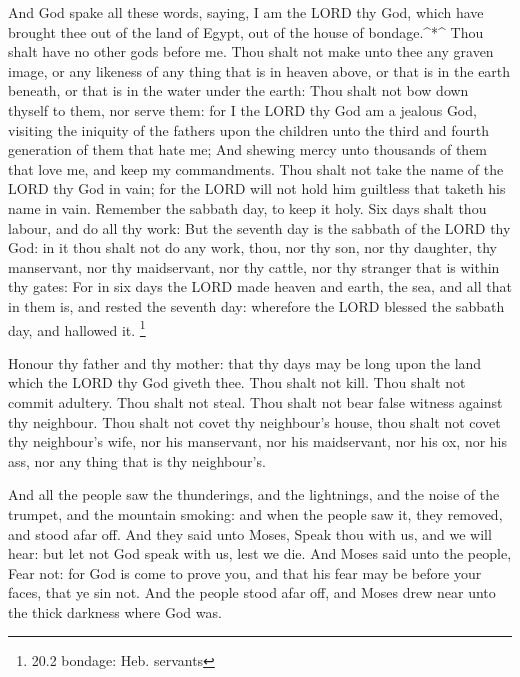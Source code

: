  And God spake all these words, saying,  I am
the LORD thy God, which have brought thee out of the land of Egypt, out
of the house of bondage.\^{}*\^{}  Thou shalt have no other
gods before me.  Thou shalt not make unto thee any graven
image, or any likeness of any thing that is in heaven above, or that is
in the earth beneath, or that is in the water under the earth:
 Thou shalt not bow down thyself to them, nor serve them:
for I the LORD thy God am a jealous God, visiting the iniquity of the
fathers upon the children unto the third and fourth generation of them
that hate me;  And shewing mercy unto thousands of them that
love me, and keep my commandments.  Thou shalt not take the
name of the LORD thy God in vain; for the LORD will not hold him
guiltless that taketh his name in vain.  Remember the
sabbath day, to keep it holy.  Six days shalt thou labour,
and do all thy work:  But the seventh day is the sabbath of
the LORD thy God: in it thou shalt not do any work, thou, nor thy son,
nor thy daughter, thy manservant, nor thy maidservant, nor thy cattle,
nor thy stranger that is within thy gates:  For in six days
the LORD made heaven and earth, the sea, and all that in them is, and
rested the seventh day: wherefore the LORD blessed the sabbath day, and
hallowed it. \footnote{20.2 bondage: Heb. servants}

 Honour thy father and thy mother: that thy days may be
long upon the land which the LORD thy God giveth thee. 
Thou shalt not kill.  Thou shalt not commit adultery.
 Thou shalt not steal.  Thou shalt not bear
false witness against thy neighbour.  Thou shalt not covet
thy neighbour's house, thou shalt not covet thy neighbour's wife, nor
his manservant, nor his maidservant, nor his ox, nor his ass, nor any
thing that is thy neighbour's.

 And all the people saw the thunderings, and the
lightnings, and the noise of the trumpet, and the mountain smoking: and
when the people saw it, they removed, and stood afar off. 
And they said unto Moses, Speak thou with us, and we will hear: but let
not God speak with us, lest we die.  And Moses said unto
the people, Fear not: for God is come to prove you, and that his fear
may be before your faces, that ye sin not.  And the people
stood afar off, and Moses drew near unto the thick darkness where God
was.

